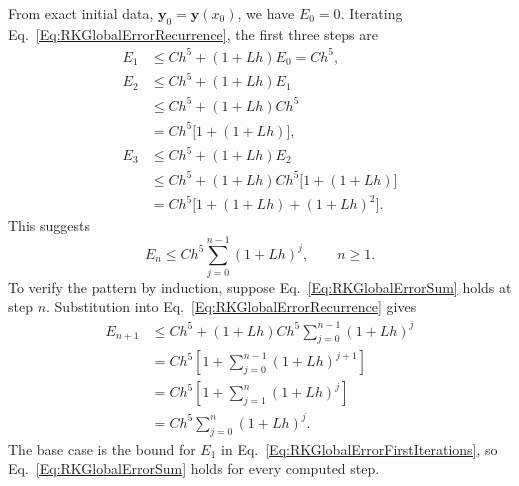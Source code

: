 From exact initial data, $\mathbf y_0=\mathbf y(x_0)$, we have $E_0=0$.
Iterating Eq.~\ref{Eq:RKGlobalErrorRecurrence}, the first three steps are
\begin{equation}\label{Eq:RKGlobalErrorFirstIterations}
\begin{aligned}
 E_1&\leq Ch^5+(1+Lh)E_0=Ch^5,\\
 E_2&\leq Ch^5+(1+Lh)E_1\\
    &\leq Ch^5+(1+Lh)Ch^5\\
    &=Ch^5\bigl[1+(1+Lh)\bigr],\\
 E_3&\leq Ch^5+(1+Lh)E_2\\
    &\leq Ch^5+(1+Lh)Ch^5\bigl[1+(1+Lh)\bigr]\\
    &=Ch^5\bigl[1+(1+Lh)+(1+Lh)^2\bigr].
\end{aligned}
\end{equation}
This suggests
\begin{equation}\label{Eq:RKGlobalErrorSum}
 E_n\leq Ch^5\sum_{j=0}^{n-1}(1+Lh)^j,\qquad n\geq1.
\end{equation}
To verify the pattern by induction, suppose
Eq.~\ref{Eq:RKGlobalErrorSum} holds at step $n$. Substitution into
Eq.~\ref{Eq:RKGlobalErrorRecurrence} gives
\begin{equation}\label{Eq:RKGlobalErrorInduction}
\begin{aligned}
 E_{n+1}
 &\leq Ch^5+(1+Lh)Ch^5\sum_{j=0}^{n-1}(1+Lh)^j\\
 &=Ch^5\left[1+\sum_{j=0}^{n-1}(1+Lh)^{j+1}\right]\\
 &=Ch^5\left[1+\sum_{j=1}^{n}(1+Lh)^j\right]\\
 &=Ch^5\sum_{j=0}^{n}(1+Lh)^j.
\end{aligned}
\end{equation}
The base case is the bound for $E_1$ in
Eq.~\ref{Eq:RKGlobalErrorFirstIterations}, so
Eq.~\ref{Eq:RKGlobalErrorSum} holds for every computed step.

